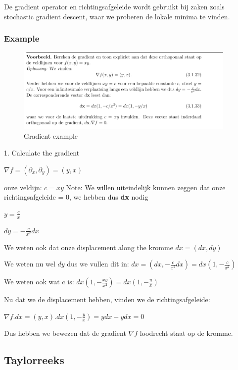 \documentclass[a4paper]{report}
\begin{document}
De gradient operator en richtingsafgeleide wordt gebruikt bij zaken zoals stochastic gradient descent, waar we proberen de lokale minima te vinden.

\subsubsection{Example}
\begin{figure}[H]
	\begin{center}
		\includegraphics[width=0.95\textwidth]{./images/gradient_2.png}
	\end{center}
	\caption{Gradient example}
	\label{}
\end{figure}

1. Calculate the gradient

$\nabla f = (\partial_x, \partial_y) = (y, x)$

onze veldijn: $c = xy$
Note: We willen uiteindelijk kunnen zeggen dat onze richtingsafgeleide = 0, we hebben dus \textbf{dx} nodig

$y = \frac{c}{x}$

$dy = - \frac{c}{x^2} dx$

We weten ook dat onze displacement along the kromme $dx = (dx, dy)$

We weten nu wel $dy$ dus we vullen dit in: $dx = (dx, - \frac{c}{x^2} dx) = dx(1, - \frac{c}{x^2})$

We weten ook wat c is: $dx(1, - \frac{xy}{x^2}) = dx(1, - \frac{y}{x})$

Nu dat we de displacement hebben, vinden we de richtingsafgeleide:

$\nabla f . dx = (y, x) . dx(1, - \frac{y}{x}) = ydx - ydx = 0$

Dus hebben we bewezen dat de gradient $\nabla f$ loodrecht staat op de kromme.

\subsection{Taylorreeks}
\end{document}

